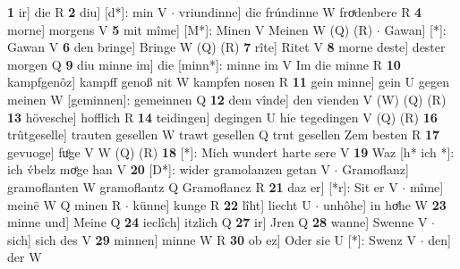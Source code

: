 \documentclass[8pt,a4paper,notitlepage]{article}
\begin{document}
\begin{table}[ht]
\begin{minipage}[t]{0.5\linewidth}
\textbf{1} ir] die R \textbf{2} diu] [d*]: min V  $\cdot$ vriundinne] die frúndinne W froͯdenbere R \textbf{4} morne] morgens V \textbf{5} mit mîme] [M*]: Minen V Meinen W (Q) (R)  $\cdot$ Gawan] [*]: Gawan V \textbf{6} den bringe] Bringe W (Q) (R) \textbf{7} rîte] Ritet V \textbf{8} morne deste] dester morgen Q \textbf{9} diu minne im] die [minn*]: minne im V Im die minne R \textbf{10} kampfgenôz] kampff genoß nit W kampfen nosen R \textbf{11} gein minne] gein U gegen meinen W [geminnen]: gemeinnen Q \textbf{12} dem vînde] den vienden V (W) (Q) (R) \textbf{13} hövesche] hofflich R \textbf{14} teidingen] degingen U hie tegedingen V (Q) (R) \textbf{16} trûtgeselle] trauten gesellen W trawt gesellen Q trut gesellen Zem besten R \textbf{17} gevuoge] fuͦge V W (Q) (R) \textbf{18} [*]: Mich wundert harte sere V \textbf{19} Waz [h* ich *]: ich v́belz moͤge han V \textbf{20} [D*]: wider gramolanzen getan V  $\cdot$ Gramoflanz] gramoflanten W gramoflantz Q Gramoflancz R \textbf{21} daz er] [*r]: Sit er V  $\cdot$ mîme] meinē W Q minen R  $\cdot$ künne] kunge R \textbf{22} lîht] liecht U  $\cdot$ unhôhe] in hoͤhe W \textbf{23} minne und] Meine Q \textbf{24} ieclîch] itzlich Q \textbf{27} ir] Jren Q \textbf{28} wanne] Swenne V  $\cdot$ sich] sich des V \textbf{29} minnen] minne W R \textbf{30} ob ez] Oder sie U [*]: Swenz V  $\cdot$ den] der W \newline
\end{minipage}
\end{table}
\end{document}
